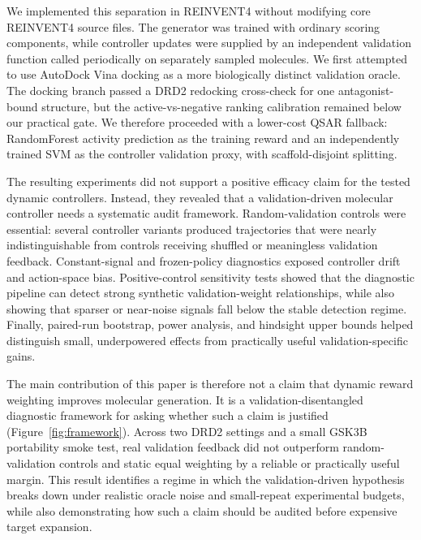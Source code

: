 \documentclass[referee,lineno,pdflatex,sn-basic]{sn-jnl}
\theoremstyle{thmstyleone}%
\theoremstyle{thmstyletwo}%
\theoremstyle{thmstylethree}%
\begin{document}
We implemented this separation in REINVENT4 without modifying core REINVENT4 source files. The generator was trained with ordinary scoring components, while controller updates were supplied by an independent validation function called periodically on separately sampled molecules. We first attempted to use AutoDock Vina docking as a more biologically distinct validation oracle. The docking branch passed a DRD2 redocking cross-check for one antagonist-bound structure, but the active-vs-negative ranking calibration remained below our practical gate. We therefore proceeded with a lower-cost QSAR fallback: RandomForest activity prediction as the training reward and an independently trained SVM as the controller validation proxy, with scaffold-disjoint splitting.

The resulting experiments did not support a positive efficacy claim for the tested dynamic controllers. Instead, they revealed that a validation-driven molecular controller needs a systematic audit framework. Random-validation controls were essential: several controller variants produced trajectories that were nearly indistinguishable from controls receiving shuffled or meaningless validation feedback. Constant-signal and frozen-policy diagnostics exposed controller drift and action-space bias. Positive-control sensitivity tests showed that the diagnostic pipeline can detect strong synthetic validation-weight relationships, while also showing that sparser or near-noise signals fall below the stable detection regime. Finally, paired-run bootstrap, power analysis, and hindsight upper bounds helped distinguish small, underpowered effects from practically useful validation-specific gains.

The main contribution of this paper is therefore not a claim that dynamic reward weighting improves molecular generation. It is a validation-disentangled diagnostic framework for asking whether such a claim is justified (Figure~\ref{fig:framework}). Across two DRD2 settings and a small GSK3B portability smoke test, real validation feedback did not outperform random-validation controls and static equal weighting by a reliable or practically useful margin. This result identifies a regime in which the validation-driven hypothesis breaks down under realistic oracle noise and small-repeat experimental budgets, while also demonstrating how such a claim should be audited before expensive target expansion.
\end{document}
